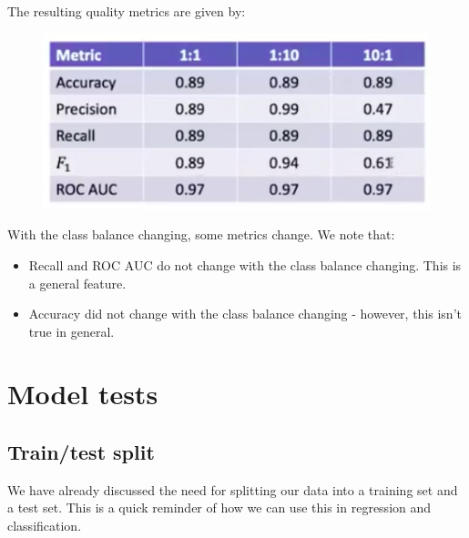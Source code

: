 \begin{frameex}
\begin{figure}[H]
\end{figure}
The resulting quality metrics are given by:
\begin{figure}[H]
\centering
\includegraphics[scale=0.4]{classifiertable.png}
\end{figure}
With the class balance changing, some metrics change. We note that:
\begin{itemize}
\item Recall and ROC AUC do not change with the class balance changing. This is a general feature.
\item Accuracy did not change with the class balance changing - however, this isn't true in general.
\end{itemize}
\end{frameex}




\newpage
\section{Model tests}

\subsection{Train/test split}
We have already discussed the need for splitting our data into a training set and a test set. This is a quick reminder of how we can use this in regression and classification.

